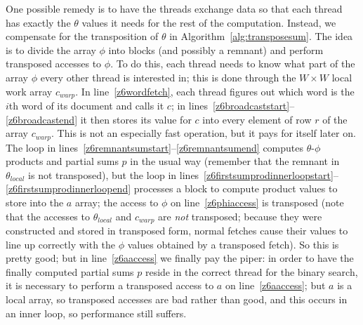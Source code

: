 \documentclass[10pt,nohyperref]{sigplanconf}
\begin{document}
One possible remedy is to have the threads exchange data so that each thread has exactly the $\theta$ values
it needs for the rest of the computation.  Instead, we compensate for the transposition of
$\theta$ in Algorithm~\ref{alg:transposesum}.
The idea is to divide the array $\phi$ into blocks (and possibly a remnant)
and perform transposed accesses to $\phi$.  To do this, each thread needs to know what part of
the array $\phi$ every other thread is interested in; this is done through the $W \times W$ local work array $c_{\mathit{warp}}$.
In line~\ref{z6wordfetch}, each thread figures out which word is the $i$th word of its document and calls it $c$;
in lines~\hbox{\ref{z6broadcaststart}--\ref{z6broadcastend}} it then stores its value for $c$ into every element of row $r$
of the array $c_{\mathit{warp}}$.
This is not an especially fast operation, but it pays for itself later on.
The loop in lines~\hbox{\ref{z6remnantsumstart}--\ref{z6remnantsumend}} computes $\theta$-$\phi$ products and partial sums $p$
in the usual way (remember that the remnant in $\theta_{\mathit{local}}$ is not transposed), but the loop in
lines~\hbox{\ref{z6firstsumprodinnerloopstart}--\ref{z6firstsumprodinnerloopend}}
processes a block to compute product values to store into the $a$ array;
the access to $\phi$ on line~\ref{z6phiaccess} is transposed (note that the accesses to $\theta_{\mathit{local}}$
and $c_{\mathit{warp}}$ are \emph{not} transposed; because they were constructed and stored in transposed form,
normal fetches cause their values to line up correctly with the $\phi$ values obtained by a transposed fetch).
So this is pretty good; but in line~\ref{z6aaccess} we finally pay the piper: in order to have the finally computed partial sums $p$
reside in the correct thread for the binary search, it is necessary to perform a transposed access to $a$
on line~\ref{z6aaccess}; but $a$ is a local array, so transposed accesses are bad rather than good,
and this occurs in an inner loop, so performance still suffers.
\end{document}
